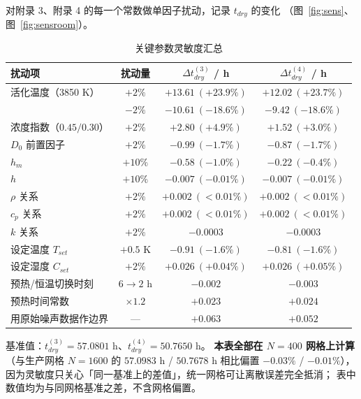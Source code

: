 对附录 3、附录 4 的每一个常数做单因子扰动，记录 $t_{dry}$ 的变化
（图~\ref{fig:sens}、图~\ref{fig:sensroom}）。

\begin{table}[htbp]
\centering
\caption{关键参数灵敏度汇总}
\label{tab:sens}
\footnotesize
\begin{tabular}{lccc}
\toprule[1.5pt]
扰动项 & 扰动量 & $\Delta t_{dry}^{(3)}$ / h & $\Delta t_{dry}^{(4)}$ / h \\
\midrule[1pt]
活化温度（3850 K）      & $+2\%$   & $+13.61\ (+23.9\%)$ & $+12.02\ (+23.7\%)$ \\
                        & $-2\%$   & $-10.61\ (-18.6\%)$ & $-9.42\ (-18.6\%)$ \\
浓度指数（$0.45/0.30$） & $+2\%$   & $+2.80\ (+4.9\%)$   & $+1.52\ (+3.0\%)$ \\
$D_0$ 前置因子          & $+2\%$   & $-0.99\ (-1.7\%)$   & $-0.87\ (-1.7\%)$ \\
$h_m$                   & $+10\%$  & $-0.58\ (-1.0\%)$   & $-0.22\ (-0.4\%)$ \\
$h$                     & $+10\%$  & $-0.007\ (-0.01\%)$ & $-0.007\ (-0.01\%)$ \\
$\rho$ 关系             & $+2\%$   & $+0.002\ (<0.01\%)$ & $+0.002\ (<0.01\%)$ \\
$c_p$ 关系              & $+2\%$   & $+0.002\ (<0.01\%)$ & $+0.002\ (<0.01\%)$ \\
$k$ 关系                & $+2\%$   & $-0.0003$           & $-0.0003$ \\
\midrule[1pt]
设定温度 $T_{set}$      & $+0.5$ K & $-0.91\ (-1.6\%)$   & $-0.81\ (-1.6\%)$ \\
设定湿度 $C_{set}$      & $+2\%$   & $+0.026\ (+0.04\%)$ & $+0.026\ (+0.05\%)$ \\
预热/恒温切换时刻       & $6\to2$ h & $-0.002$           & $-0.003$ \\
预热时间常数            & $\times1.2$ & $+0.023$         & $+0.024$ \\
用原始噪声数据作边界    & ---      & $+0.063$            & $+0.052$ \\
\bottomrule[1.5pt]
\end{tabular}

\vspace{2pt}
{\footnotesize 基准值：$t_{dry}^{(3)}=57.0801$ h、$t_{dry}^{(4)}=50.7650$ h。
\textbf{本表全部在 $N=400$ 网格上计算}（与生产网格 $N=1600$ 的
$57.0983$ h / $50.7678$ h 相比偏置 $-0.03\%$ / $-0.01\%$），
因为灵敏度只关心「同一基准上的差值」，统一网格可让离散误差完全抵消；
表中数值均为与同网格基准之差，不含网格偏置。}
\end{table}

